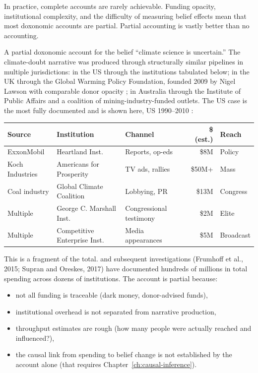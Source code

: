 In practice, complete accounts are rarely achievable.
Funding opacity, institutional complexity, and the difficulty of measuring belief effects mean that most doxonomic accounts are partial. Partial accounting is vastly better than no accounting.

\begin{example}
\label{ex:climate-account}
A partial doxonomic account for the belief ``climate science is uncertain.'' The climate-doubt narrative was produced through structurally similar pipelines in multiple jurisdictions: in the US through the institutions tabulated below; in the UK through the Global Warming Policy Foundation, founded 2009 by Nigel Lawson with comparable donor opacity \autocite{painter2014, hope2019}; in Australia through the Institute of Public Affairs and a coalition of mining-industry-funded outlets. The US case is the most fully documented and is shown here, US 1990--2010 \autocite{oreskes2010}:

\begin{center}
\begin{tabular}{p{2.3cm}p{2.5cm}p{2.5cm}rp{1.5cm}}
\toprule
\textbf{Source} & \textbf{Institution} & \textbf{Channel} & \textbf{\$ (est.)} & \textbf{Reach} \\
\midrule
ExxonMobil & Heartland Inst. & Reports, op-eds & \$8M & Policy \\
Koch Industries & Americans for Prosperity & TV ads, rallies & \$50M+ & Mass \\
Coal industry & Global Climate Coalition & Lobbying, PR & \$13M & Congress \\
Multiple & George C. Marshall Inst. & Congressional testimony & \$2M & Elite \\
Multiple & Competitive Enterprise Inst. & Media appearances & \$5M & Broadcast \\
\bottomrule
\end{tabular}
\end{center}

This is a fragment of the total.
\textcite{oreskes2010} and subsequent investigations (Frumhoff et al., 2015; Supran and Oreskes, 2017) have documented hundreds of millions in total spending across dozens of institutions.
The account is partial because:
\begin{itemize}[nosep]
  \item not all funding is traceable (dark money, donor-advised funds),
  \item institutional overhead is not separated from narrative production,
  \item throughput estimates are rough (how many people were actually reached and influenced?),
  \item the causal link from spending to belief change is not established by the account alone (that requires Chapter~\ref{ch:causal-inference}).
\end{itemize}
\end{example}


